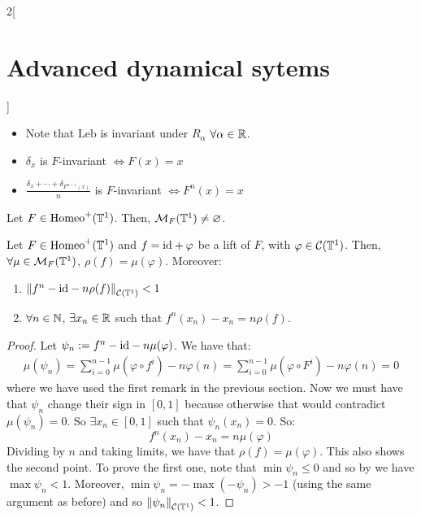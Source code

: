\documentclass[../../../main_math.tex]{subfiles}
\begin{document}
\begin{multicols}{2}[\section{Advanced dynamical sytems}]
\begin{proposition}
    \begin{itemize}
      \item Note that $\text{Leb}$ is invariant under $R_\alpha$ $\forall \alpha\in\mathbb{R}$.
      \item $\delta_x$ is $F$-invariant $\iff F(x)=x$
      \item $\displaystyle\frac{\delta_x+\cdots+\delta_{F^{n-1}(x)}}{n}$ is $F$-invariant $\iff F^n(x)=x$
    \end{itemize}
  \end{proposition}
  \begin{theorem}
    Let $F\in\mathrm{Homeo}^+(\mathbb{T}^1)$. Then, $\mathcal{M}_F(\mathbb{T}^1)\ne\varnothing$.
  \end{theorem}
  \begin{proposition}
    Let $F\in\mathrm{Homeo}^+(\mathbb{T}^1)$ and $f=\mathrm{id}+\varphi$ be a lift of $F$, with $\varphi\in\mathcal{C}(\mathbb{T}^1)$. Then, $\forall\mu\in\mathcal{M}_F(\mathbb{T}^1)$, $\rho(f)=\mu(\varphi)$. Moreover:
    \begin{enumerate}
      \item $\left\|f^n-\mathrm{id} -n\rho(f)\right\|_{\mathcal{C}(\mathbb{T}^1)}<1$
      \item $\forall n\in\mathbb{N}$, $\exists x_n\in\mathbb{R}$ such that $f^n(x_n)-x_n=n\rho(f)$.
    \end{enumerate}
  \end{proposition}
  \begin{proof}
    Let $\psi_n:= f^n-\mathrm{id} -n\mu(\varphi)$. We have that:
    \begin{multline*}
      \mu(\psi_n)=\sum_{i=0}^{n-1}\mu(\varphi\circ f^i)-n\varphi(n)=\sum_{i=0}^{n-1}\mu(\varphi\circ F^i)-n\varphi(n)=0
    \end{multline*}
    where we have used the first remark in the previous section. Now we must have that $\psi_n$ change their sign in $[0,1]$ because otherwise that would contradict $\mu(\psi_n)=0$. So $\exists x_n\in[0,1]$ such that $\psi_n(x_n)=0$. So:
    $$
      f^n(x_n)-x_n=n\mu(\varphi)
    $$
    Dividing by $n$ and taking limits, we have that $\rho(f)=\mu(\varphi)$. This also shows the second point. To prove the first one, note that $\min\psi_n\leq 0$ and so by  we have $\max\psi_n <1$. Moreover, $\min\psi_n =-\max(-\psi_n) >-1$ (using the same argument as before) and so $\left\|\psi_n\right\|_{\mathcal{C}(\mathbb{T}^1)}<1$.
  \end{proof}

\end{multicols}
\end{document}
